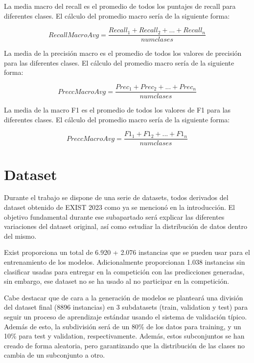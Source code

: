 La media macro del recall es el promedio de todos los puntajes de recall para diferentes clases. El cálculo del promedio macro sería de la siguiente forma:

\begin{equation}
RecallMacroAvg = \frac{Recall_1+Recall_2+...+Recall_n}{num clases}
\label{Recall-Macro-Avg-Formula}
\end{equation}

La media de la precisión macro es el promedio de todos los valores de precisión para las diferentes clases. El cálculo del promedio macro sería de la siguiente forma:

\begin{equation}
PreccMacroAvg = \frac{Prec_1+Prec_2+...+Prec_n}{num clases}
\label{Precision-Macro-Avg-Formula}
\end{equation}

La media de la macro F1 es el promedio de todos los valores de F1 para las diferentes clases. El cálculo del promedio macro sería de la siguiente forma:

\begin{equation}
PreccMacroAvg = \frac{F1_1+F1_2+...+F1_n}{num clases}
\label{F1-Macro-Avg-Formula}
\end{equation}

\section{Dataset} \label{dataset-study}

Durante el trabajo se dispone de una serie de datasets, todos derivados del dataset obtenido de EXIST 2023 \cite{EXIST2023} como ya se mencionó en la introducción. El objetivo fundamental durante ese subapartado será explicar las diferentes variaciones del dataset original, así como estudiar la distribución de datos dentro del mismo.

Exist proporciona un total de 6.920 + 2.076 instancias que se pueden usar para el entrenamiento de los modelos. Adicionalmente proporcionan 1.038 instancias sin clasificar usadas para entregar en la competición con las predicciones generadas, sin embargo, ese dataset no se ha usado al no participar en la competición.

Cabe destacar que de cara a la generación de modelos se planteará una división del dataset final (8896 instancias) en 3 subdatasets (train, validation y test) para seguir un proceso de aprendizaje estándar usando el sistema de validación típico. Además de esto, la subdivisión será de un 80\% de los datos para training, y un 10\% para test y validation, respectivamente. Además, estos subconjuntos se han creado de forma aleatoria, pero garantizando que la distribución de las clases no cambia de un subconjunto a otro. 

